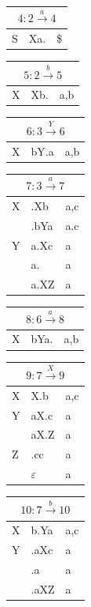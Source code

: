 \documentclass[11pt]{scrartcl}
\begin{document}
	\begin{table}[!htbp]
		\begin{tabular}[t]{l|l|l}
			\multicolumn{3}{c}{$4: 2 \xrightarrow{a} 4$} \\ \hline
			S & Xa. & \$ \\ 
		\end{tabular}
		\begin{tabular}[t]{l|l|l}
			\multicolumn{3}{c}{$5: 2 \xrightarrow{b} 5$} \\ \hline
			X & Xb. & a,b \\ 
		\end{tabular}
		\begin{tabular}[t]{l|l|l}
			\multicolumn{3}{c}{$6: 3 \xrightarrow{Y} 6$} \\ \hline
			X & bY.a & a,b \\ 
		\end{tabular}
		\begin{tabular}[t]{l|l|l}
			\multicolumn{3}{c}{$7: 3 \xrightarrow{a} 7$} \\ \hline
			X & .Xb & a,c \\
			& .bYa &a.c \\ \hline
			Y & a.Xc & a \\
			& a. & a \\
			& a.XZ & a 
		\end{tabular}
	\end{table}
		
	\begin{table}[!htbp]
			\begin{tabular}[t]{l|l|l}
				\multicolumn{3}{c}{$8: 6 \xrightarrow{a} 8$} \\ \hline
				X & bYa. & a,b \\ 
			\end{tabular}
			\begin{tabular}[t]{l|l|l}
				\multicolumn{3}{c}{$9: 7 \xrightarrow{X} 9$} \\ \hline
				X & X.b & a,c \\ \hline
				Y & aX.c & a \\ 
				 & aX.Z & a \\ \hline
				Z & .cc & a \\
				& $\varepsilon$ & a 
			\end{tabular}
			\begin{tabular}[t]{l|l|l}
				\multicolumn{3}{c}{$10: 7 \xrightarrow{b} 10$} \\ \hline
				X & b.Ya & a,c \\ \hline
				Y & .aXc & a \\ 
				& .a & a \\ 
				 & .aXZ & a \\
			\end{tabular}
		\end{table}
\end{document}
